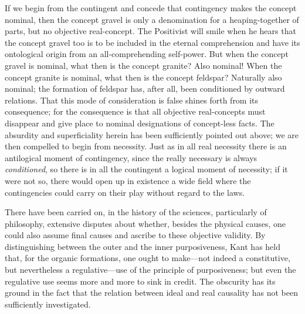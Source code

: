 \documentclass[12pt]{article}
\begin{document}
If we begin from the contingent and concede that contingency makes the
concept nominal, then the concept gravel is only a denomination for a
heaping-together of parts, but no objective real-concept. The Positivist
will smile when he hears that the concept gravel too is to be included in the
eternal comprehension and have its ontological origin from an
all-comprehending self-power. But when the concept gravel is nominal, what
then is the concept granite? Also nominal! When the concept granite is
nominal, what then is the concept feldspar? Naturally also nominal; the
formation of feldspar has, after all, been conditioned by outward relations.
That this mode of consideration is false shines forth from its consequence;
for the consequence is that all objective real-concepts must disappear and
give place to nominal designations of concept-less facts. The absurdity and
superficiality herein has been sufficiently pointed out above; we are then
compelled to begin from necessity. Just as in all real necessity there is an
antilogical moment of contingency, since the really necessary is always
\emph{conditioned}, so there is in all the contingent a logical moment of
necessity; if it were not so, there would open up in existence a wide field
where the contingencies could carry on their play without regard to the
laws.

There have been carried on, in the history of the sciences, particularly of
philosophy, extensive disputes about whether, besides the physical causes,
one could also assume final causes and ascribe to these objective validity.
By distinguishing between the outer and the inner purposiveness, Kant has
held that, for the organic formations, one ought to make—not indeed a
constitutive, but nevertheless a regulative—use of the principle of
purposiveness; but even the regulative use seems more and more to sink in
credit. The obscurity has its ground in the fact that the relation between
ideal and real causality has not been sufficiently investigated.
\end{document}
